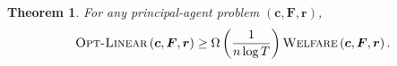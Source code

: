 \documentclass{article}
\newtheorem{theorem}{Theorem}
\newcommand{\costvector}{\bm{c}}
\newcommand{\ForecastTensor}{\bm{F}}
\newcommand{\rewardvector}{\bm{r}}
\newcommand{\PrincipalAgentProblem}{\left(\costvector, \ForecastTensor, \rewardvector\right)}
\newcommand{\OWelfare}{\textsc{Welfare}}
\newcommand{\OLinear}{\textsc{Opt-Linear}}
\begin{document}
\begin{theorem}
\label{thm:main-upper}
For any principal-agent problem $\PrincipalAgentProblem$,
\begin{align*}
  \OLinear \PrincipalAgentProblem \ge \Omega \left(\frac{1}{n \log T}\right) \OWelfare \PrincipalAgentProblem\text{.}
\end{align*}
\end{theorem}

\newcommand{\Breakpoint}[1]{\alpha_{#1}}
\newcommand{\TypedBreakpoint}[2]{\Breakpoint{#2}^{(#1)}}
\newcommand{\CoefficientJump}[1]{w_{#1}}
\newcommand{\TypedCoefficientJump}[2]{\CoefficientJump{#2}^{(#1)}}
\newcommand{\CumulativeCoefficientJump}[1]{W_{#1}}
\newcommand{\BiasDrop}[1]{\delta_{#1}}
\newcommand{\TypedBiasDrop}[2]{\BiasDrop{#2}^{(#1)}}
\newcommand{\CumulativeBiasDrop}[1]{D_{#1}}

\newcommand{\MagicDifference}[1]{v_{#1}}
\newcommand{\CumulativeMagicDifference}[1]{V_{#1}}

\newcommand{\MagicRatio}[1]{\beta_{#1}}
\end{document}
